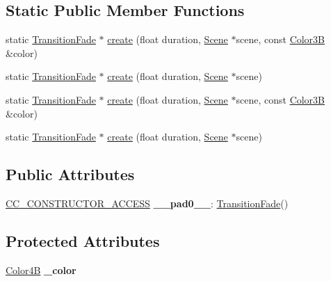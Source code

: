 \subsection*{Static Public Member Functions}
\begin{DoxyCompactItemize}
\item 
static \hyperlink{classTransitionFade}{Transition\+Fade} $\ast$ \hyperlink{classTransitionFade_a9d7258f03faf8728257325a848f5e99e}{create} (float duration, \hyperlink{classScene}{Scene} $\ast$scene, const \hyperlink{structColor3B}{Color3B} \&color)
\item 
static \hyperlink{classTransitionFade}{Transition\+Fade} $\ast$ \hyperlink{classTransitionFade_afb30b94db1c6ba7b58b48412899f9f5f}{create} (float duration, \hyperlink{classScene}{Scene} $\ast$scene)
\item 
static \hyperlink{classTransitionFade}{Transition\+Fade} $\ast$ \hyperlink{classTransitionFade_adee7e9b425f653202bdc6db77ba93fa1}{create} (float duration, \hyperlink{classScene}{Scene} $\ast$scene, const \hyperlink{structColor3B}{Color3B} \&color)
\item 
static \hyperlink{classTransitionFade}{Transition\+Fade} $\ast$ \hyperlink{classTransitionFade_af23a63c5cace211df2f0daf7e506e18c}{create} (float duration, \hyperlink{classScene}{Scene} $\ast$scene)
\end{DoxyCompactItemize}
\subsection*{Public Attributes}
\begin{DoxyCompactItemize}
\item 
\mbox{\label{classTransitionFade_a0159137c51280e1f125536b0a3928cc0}} 
\hyperlink{_2cocos2d_2cocos_2base_2ccConfig_8h_a25ef1314f97c35a2ed3d029b0ead6da0}{C\+C\+\_\+\+C\+O\+N\+S\+T\+R\+U\+C\+T\+O\+R\+\_\+\+A\+C\+C\+E\+SS} {\bfseries \+\_\+\+\_\+pad0\+\_\+\+\_\+}\+: \hyperlink{classTransitionFade}{Transition\+Fade}()
\end{DoxyCompactItemize}
\subsection*{Protected Attributes}
\begin{DoxyCompactItemize}
\item 
\mbox{\label{classTransitionFade_afe0771f4a0865f66d145e0aae3b939ef}} 
\hyperlink{structColor4B}{Color4B} {\bfseries \+\_\+color}
\end{DoxyCompactItemize}
